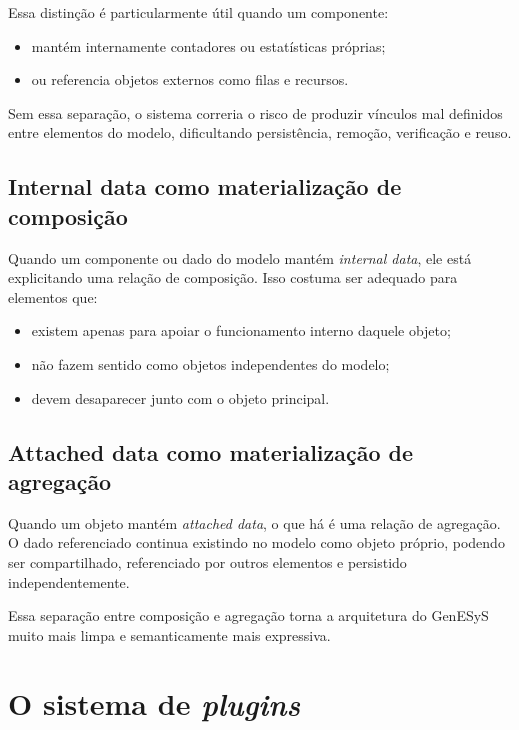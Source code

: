 Essa distinção é particularmente útil quando um componente:
\begin{itemize}
    \item mantém internamente contadores ou estatísticas próprias;
    \item ou referencia objetos externos como filas e recursos.
\end{itemize}

Sem essa separação, o sistema correria o risco de produzir vínculos mal definidos entre elementos do modelo, dificultando persistência, remoção, verificação e reuso.

\subsection{Internal data como materialização de composição}
\label{subsec:cap8_internaldata_composicao}

Quando um componente ou dado do modelo mantém \textit{internal data}, ele está explicitando uma relação de composição. Isso costuma ser adequado para elementos que:
\begin{itemize}
    \item existem apenas para apoiar o funcionamento interno daquele objeto;
    \item não fazem sentido como objetos independentes do modelo;
    \item devem desaparecer junto com o objeto principal.
\end{itemize}

\subsection{Attached data como materialização de agregação}
\label{subsec:cap8_attacheddata_agregacao}

Quando um objeto mantém \textit{attached data}, o que há é uma relação de agregação. O dado referenciado continua existindo no modelo como objeto próprio, podendo ser compartilhado, referenciado por outros elementos e persistido independentemente.

Essa separação entre composição e agregação torna a arquitetura do GenESyS muito mais limpa e semanticamente mais expressiva.

\section{O sistema de \textit{plugins}}
\label{sec:cap8_sistema_plugins}


